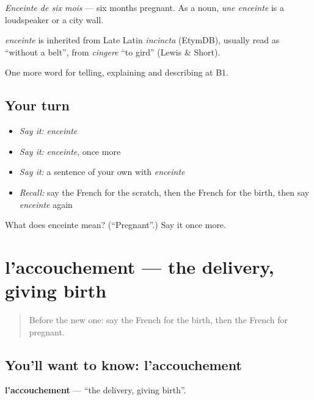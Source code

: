 \emph{Enceinte de six mois} — six months pregnant. As a noun, \emph{une enceinte} is a loudspeaker or a city wall.

\begin{cousinweb}
\emph{enceinte} is inherited from Late Latin \emph{incincta} (EtymDB), usually read as \textquotedblleft{}without a belt\textquotedblright{}, from \emph{cingere} \textquotedblleft{}to gird\textquotedblright{} (Lewis \& Short).
\end{cousinweb}

\begin{grammarlens}[title={What you've built}]
One more word for telling, explaining and describing at B1.
\end{grammarlens}

\subsection*{Your turn}
\begin{itemize}
\raggedright
  \item \emph{Say it:} \emph{enceinte}
  \item \emph{Say it:} \emph{enceinte}, once more
  \item \emph{Say it:} a sentence of your own with \emph{enceinte}
  \item \emph{Recall:} say the French for the scratch, then the French for the birth, then say \emph{enceinte} again
\end{itemize}

\begin{tcolorbox}[breakable,colback=teal!4,colframe=teal!35!black,title={Before you move on}]
What does enceinte mean? (\textquotedblleft{}Pregnant\textquotedblright{}.) Say it once more.
\end{tcolorbox}
\section[l'accouchement]{l'accouchement — the delivery, giving birth}

\label{lesson:FR-C308-accouchement}



\begin{quote}
Before the new one: say the French for the birth, then the French for pregnant.
\end{quote}

\subsection*{You'll want to know: l'accouchement}
\textbf{l'accouchement} — \textquotedblleft{}the delivery, giving birth\textquotedblright{}.

